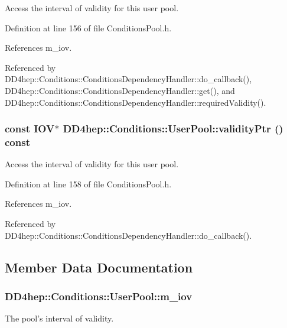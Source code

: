 Access the interval of validity for this user pool. 

Definition at line 156 of file ConditionsPool.h.

References m\_\-iov.

Referenced by DD4hep::Conditions::ConditionsDependencyHandler::do\_\-callback(), DD4hep::Conditions::ConditionsDependencyHandler::get(), and DD4hep::Conditions::ConditionsDependencyHandler::requiredValidity().\hypertarget{class_d_d4hep_1_1_conditions_1_1_user_pool_abb6fba1bb29215a197f816507826bc00}{
\subsubsection[{validityPtr}]{\setlength{\rightskip}{0pt plus 5cm}const {\bf IOV}$\ast$ DD4hep::Conditions::UserPool::validityPtr () const}}
\label{class_d_d4hep_1_1_conditions_1_1_user_pool_abb6fba1bb29215a197f816507826bc00}


Access the interval of validity for this user pool. 

Definition at line 158 of file ConditionsPool.h.

References m\_\-iov.

Referenced by DD4hep::Conditions::ConditionsDependencyHandler::do\_\-callback().

\subsection{Member Data Documentation}
\hypertarget{class_d_d4hep_1_1_conditions_1_1_user_pool_a5d5c7664cba0150097ebb69b218d44f0}{
\subsubsection[{m\_\-iov}]{ {\bf DD4hep::Conditions::UserPool::m\_\-iov}}}
\label{class_d_d4hep_1_1_conditions_1_1_user_pool_a5d5c7664cba0150097ebb69b218d44f0}


The pool's interval of validity. 

